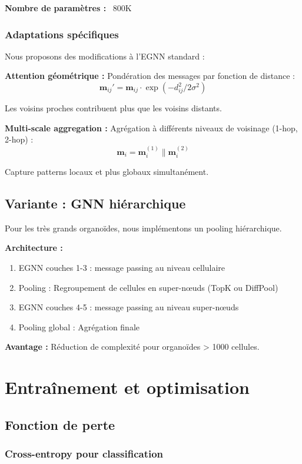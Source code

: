 \textbf{Nombre de paramètres :} ~800K

\subsubsection{Adaptations spécifiques}

Nous proposons des modifications à l'EGNN standard :

\textbf{Attention géométrique :}
Pondération des messages par fonction de distance :
\[
\mathbf{m}_{ij}' = \mathbf{m}_{ij} \cdot \exp(-d_{ij}^2 / 2\sigma^2)
\]

Les voisins proches contribuent plus que les voisins distants.

\textbf{Multi-scale aggregation :}
Agrégation à différents niveaux de voisinage (1-hop, 2-hop) :
\[
\mathbf{m}_i = \mathbf{m}_i^{(1)} \| \mathbf{m}_i^{(2)}
\]

Capture patterns locaux et plus globaux simultanément.

\subsection{Variante : GNN hiérarchique}

Pour les très grands organoïdes, nous implémentons un pooling hiérarchique.

\textbf{Architecture :}
\begin{enumerate}
    \item EGNN couches 1-3 : message passing au niveau cellulaire
    \item Pooling : Regroupement de cellules en super-nœuds (TopK ou DiffPool)
    \item EGNN couches 4-5 : message passing au niveau super-nœuds
    \item Pooling global : Agrégation finale
\end{enumerate}

\textbf{Avantage :} Réduction de complexité pour organoïdes > 1000 cellules.

\section{Entraînement et optimisation}

\subsection{Fonction de perte}

\subsubsection{Cross-entropy pour classification}

